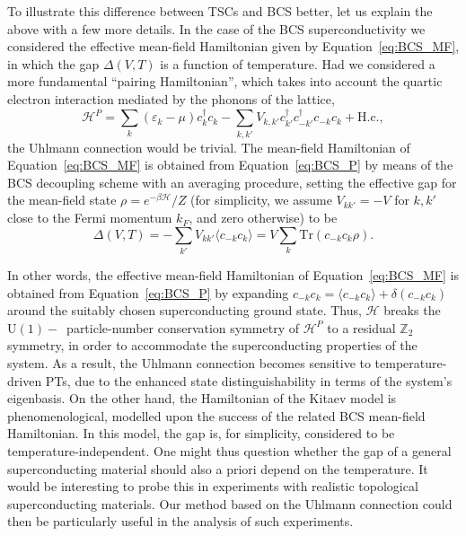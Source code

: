 To illustrate this difference between TSCs and BCS better, let us explain the above with a few more details.
In the case of the BCS superconductivity we considered the effective mean-field Hamiltonian given by Equation~\eqref{eq:BCS_MF},
in which the gap $\Delta(V,T)$ is a function of temperature. Had we considered a more fundamental ``pairing Hamiltonian'', which takes into account the quartic electron interaction mediated by the phonons of the lattice,
\begin{equation}
\label{eq:BCS_P}
\mathcal{H}^{P}=\sum_{k} (\varepsilon_{k}-\mu)c_{k}^{\dagger}c_{k}-\sum_{k,k'} V_{k,k'}c_{k'}^{\dagger}c_{-k'}^{\dagger}c_{-k}c_{k} + \text{H.c.},	
\end{equation}
the Uhlmann connection would be trivial. The mean-field Hamiltonian of Equation~\eqref{eq:BCS_MF} is obtained from Equation~\eqref{eq:BCS_P} by means of the BCS decoupling scheme with an averaging procedure, setting the effective gap for the mean-field state $\rho = e^{-\beta\mathcal{H}}/Z$ (for simplicity, we assume $V_{kk'} = -V$ for $k,k'$ close to the Fermi momentum $k_F$, and zero otherwise) to be
\begin{equation}
\label{eq:gap}
\Delta(V,T) = -\sum_{k'} V_{kk'} \langle c_{-k}c_{k}\rangle = V \sum_k \mbox{Tr}(c_{-k}c_{k}\rho ).	
\end{equation}

In other words, the effective mean-field Hamiltonian of Equation~\eqref{eq:BCS_MF} is obtained from Equation~\eqref{eq:BCS_P} by expanding $c_{-k}c_{k} = \langle c_{-k}c_{k}\rangle + \delta(c_{-k}c_{k})$ around the suitably chosen superconducting ground state. Thus, $\mathcal{H}$ breaks the $\mbox{U}(1)-$~particle-number conservation symmetry of $\mathcal{H}^P$ to a residual $\mathbb Z_2$ symmetry, in order to accommodate the superconducting properties of the system. As a result, the Uhlmann connection becomes sensitive to temperature-driven PTs, due to the enhanced state distinguishability in terms of the system's eigenbasis. On the other hand, the Hamiltonian of the Kitaev model is phenomenological, modelled upon the success of the related BCS mean-field Hamiltonian. In this model, the gap is, for simplicity, considered to be temperature-independent. One might thus question whether the gap of a general superconducting material should also a priori depend on the temperature. It would be interesting to probe this  in experiments with realistic topological superconducting materials. Our method based on the Uhlmann connection could then be particularly useful in the analysis of such experiments.

